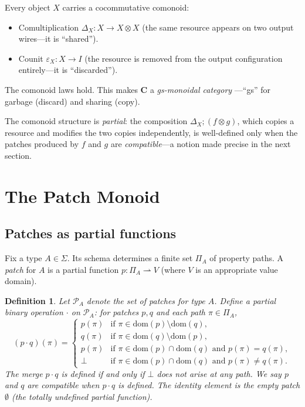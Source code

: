 \documentclass[11pt]{article}
\newtheorem{definition}[theorem]{Definition}
\newcommand{\cat}[1]{\mathbf{#1}}
\newcommand{\Patch}{\mathcal{P}}
\newcommand{\tensor}{\otimes}
\newcommand{\comp}{\mathbin{;}}
\begin{document}
    Every object $X$ carries a cocommutative comonoid:
    \begin{itemize}
        \item Comultiplication $\Delta_X \colon X \to X \tensor X$ (the same resource
        appears on two output wires---it is ``shared'').
        \item Counit $\varepsilon_X \colon X \to I$ (the resource is removed from the
        output configuration entirely---it is ``discarded'').
    \end{itemize}

    The comonoid laws hold. This makes $\cat{C}$ a \emph{gs-monoidal category}
    \cite{gadducci1997inductive}---``gs'' for garbage (discard) and sharing (copy).

    The comonoid structure is \emph{partial}: the composition $\Delta_X \comp (f \tensor g)$,
    which copies a resource and modifies the two copies independently, is well-defined only
    when the patches produced by $f$ and $g$ are \emph{compatible}---a notion made precise
    in the next section.

    \section{The Patch Monoid}
    \label{sec:patch}

    \subsection{Patches as partial functions}

    Fix a type $A \in \Sigma$. Its schema determines a finite set $\Pi_A$ of property
    paths. A \emph{patch} for $A$ is a partial function $p \colon \Pi_A \rightharpoonup V$
    (where $V$ is an appropriate value domain).

    \begin{definition}\label{def:patch-merge}
        Let $\Patch_A$ denote the set of patches for type $A$. Define a partial binary
        operation $\cdot$ on $\Patch_A$: for patches $p, q$ and each path $\pi \in \Pi_A$,
        \[
            (p \cdot q)(\pi) =
            \begin{cases}
                p(\pi) & \text{if } \pi \in \mathrm{dom}(p) \setminus \mathrm{dom}(q), \\
                q(\pi) & \text{if } \pi \in \mathrm{dom}(q) \setminus \mathrm{dom}(p), \\
                p(\pi) & \text{if } \pi \in \mathrm{dom}(p) \cap \mathrm{dom}(q)
                          \text{ and } p(\pi) = q(\pi), \\
                \bot   & \text{if } \pi \in \mathrm{dom}(p) \cap \mathrm{dom}(q)
                          \text{ and } p(\pi) \neq q(\pi).
            \end{cases}
        \]
        The merge $p \cdot q$ is \emph{defined} if and only if $\bot$ does not arise at
        any path. We say $p$ and $q$ are \emph{compatible} when $p \cdot q$ is defined.
        The identity element is the empty patch $\emptyset$ (the totally undefined partial
        function).
    \end{definition}
\end{document}
